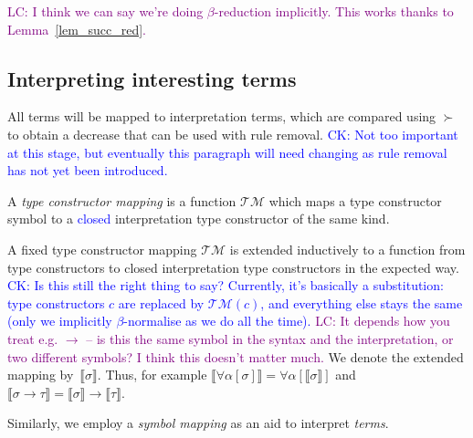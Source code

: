 \documentclass[runningheads,a4paper]{llncs}
\newcommand{\Typemap}{\mathcal{T\!M}}
\newcommand{\quant}[2]{\forall #1[#2]}
\newcommand{\typeinterpret}[1]{\llbracket #1 \rrbracket}
\newcommand{\arrtype}{\rightarrow}
\newcommand{\CK}[1]{\textcolor{blue}{CK: #1}}
\newcommand{\CKchange}[1]{\textcolor{blue}{#1}}
\newcommand{\LC}[1]{\textcolor{purple}{LC: #1}}
\begin{document}
\LC{I think we can say we're doing $\beta$-reduction implicitly. This
  works thanks to Lemma~\ref{lem_succ_red}.}

\subsection{Interpreting interesting terms}

All terms will be mapped to interpretation terms, which are compared
using $\succ$ to obtain a decrease that can be used with
rule removal. \CK{Not too important at this stage, but eventually this
paragraph will need changing as rule removal has not yet been
introduced.}

\begin{definition}\normalfont
A \emph{type constructor mapping} is a function $\Typemap$ which maps
a type constructor symbol to a \CKchange{closed} interpretation type
constructor of the same kind.

A fixed type constructor mapping $\Typemap$ is extended inductively to
a function from type constructors to closed interpretation type
constructors in the expected way.
\CK{Is this still the right thing to say? Currently, it's basically a
substitution: type constructors $c$ are replaced by $\Typemap(c)$, and
everything else stays the same (only we implicitly $\beta$-normalise as
we do all the time).}
\LC{It depends how you treat e.g. $\to$ -- is this the same symbol in
  the syntax and the interpretation, or two different symbols? I think
  this doesn't matter much.}
We denote the extended mapping
by~$\typeinterpret{\sigma}$. Thus, for example
$\typeinterpret{\quant{\alpha}{\sigma}} =
\quant{\alpha}{\typeinterpret{\sigma}}$ and $\typeinterpret{\sigma
  \arrtype \tau} = \typeinterpret{\sigma} \arrtype
\typeinterpret{\tau}$.
\end{definition}

Similarly, we employ a \emph{symbol mapping} as an aid to interpret
\emph{terms}.
\end{document}
